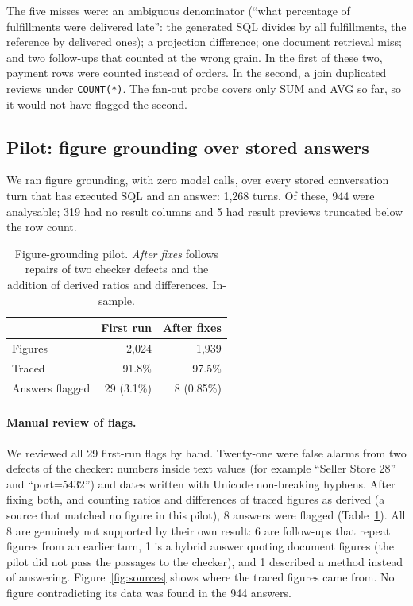 \documentclass[10pt,twocolumn]{article}
\begin{document}
The five misses were: an ambiguous denominator (``what percentage of fulfillments were delivered late'': the generated SQL divides by all fulfillments, the reference by delivered ones); a projection difference; one document retrieval miss; and two follow-ups that counted at the wrong grain. In the first of these two, payment rows were counted instead of orders. In the second, a join duplicated reviews under \texttt{COUNT(*)}. The fan-out probe covers only SUM and AVG so far, so it would not have flagged the second.

\subsection{Pilot: figure grounding over stored answers}
We ran figure grounding, with zero model calls, over every stored conversation turn that has executed SQL and an answer: 1,268 turns. Of these, 944 were analysable; 319 had no result columns and 5 had result previews truncated below the row count.

\begin{table}[t]
\centering\small
\caption{Figure-grounding pilot. \emph{After fixes} follows repairs of two checker defects and the addition of derived ratios and differences. In-sample.}\label{tab:pilot}
\begin{tabular}{@{}lrr@{}}
\toprule
 & First run & After fixes \\
\midrule
Figures & 2,024 & 1,939 \\
Traced & 91.8\% & 97.5\% \\
Answers flagged & 29 (3.1\%) & 8 (0.85\%) \\
\bottomrule
\end{tabular}
\end{table}

\paragraph{Manual review of flags.} We reviewed all 29 first-run flags by hand. Twenty-one were false alarms from two defects of the checker: numbers inside text values (for example ``Seller Store 28'' and ``port=5432'') and dates written with Unicode non-breaking hyphens. After fixing both, and counting ratios and differences of traced figures as derived (a source that matched no figure in this pilot), 8 answers were flagged (Table~\ref{tab:pilot}). All 8 are genuinely not supported by their own result: 6 are follow-ups that repeat figures from an earlier turn, 1 is a hybrid answer quoting document figures (the pilot did not pass the passages to the checker), and 1 described a method instead of answering. Figure~\ref{fig:sources} shows where the traced figures came from. No figure contradicting its data was found in the 944 answers.
\end{document}
